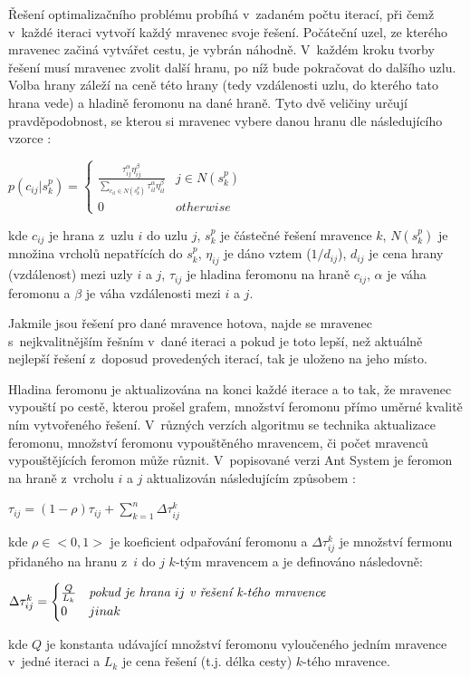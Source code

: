 \documentclass[a4paper, 12pt]{article}
\begin{document}
Řešení optimalizačního problému probíhá v~zadaném počtu iterací, při čemž v~každé iteraci vytvoří každý mravenec svoje řešení.
Počáteční uzel, ze kterého mravenec začiná vytvářet cestu, je vybrán náhodně.
V~každém kroku tvorby řešení musí mravenec zvolit další hranu, po níž bude pokračovat do dalšího uzlu. Volba hrany záleží na ceně této hrany (tedy vzdálenosti
uzlu, do kterého tato hrana vede) a hladině feromonu na dané hraně. Tyto dvě veličiny určují pravděpodobnost,
se kterou si mravenec vybere danou hranu dle následujícího vzorce \cite{aco:variations}:
\begin{center}
  $p(c_{ij}|s_k^p) =
   \begin{cases} 
      \frac{\tau^{\alpha}_{ij}\eta^{\beta}_{ij}}{\sum\limits_{c_{il}\in N(s_k^p)}{\tau^\alpha_{il}\eta^\beta_{il}}} & j \in N(s_k^p) \\
      0 & otherwise 
   \end{cases}
   $
\end{center}
kde $c_{ij}$ je hrana z~uzlu $i$ do uzlu $j$, $s_k^p$ je částečné řešení mravence $k$, $N(s_k^p)$ je množina vrcholů nepatřících do $s_k^p$, $\eta_{ij}$ je 
dáno vztem ($1/d_{ij}$), $d_{ij}$ je cena hrany (vzdálenost) mezi uzly $i$ a $j$, $\tau_{ij}$ je hladina feromonu na hraně $c_{ij}$, $\alpha$
je váha feromonu a $\beta$ je váha vzdálenosti mezi $i$ a $j$.

Jakmile jsou řešení pro dané mravence hotova, najde se mravenec s~nejkvalitnějším řešním v~dané iteraci a pokud je toto lepší, než aktuálně nejlepší řešení
z~doposud provedených iterací, tak je uloženo na jeho místo.

Hladina feromonu je aktualizována na konci každé iterace a to tak, že mravenec vypouští po cestě, kterou prošel grafem, množství feromonu přímo uměrné kvalitě
ním vytvořeného řešení. V~různých verzích algoritmu se technika aktualizace feromonu, množství feromonu vypouštěného mravencem, či počet mravenců vypouštějících 
feromon může různit. V~popisované verzi Ant System je feromon na hraně z~vrcholu $i$ a $j$ aktualizován následujícím způsobem \cite{aco:variations}:
\begin{center}
  $\tau_{ij}=(1-\rho)\tau_{ij}+\sum\limits_{k=1}^{n}\Delta\tau_{ij}^k$
\end{center}
kde $\rho \in <0,1>$ je koeficient odpařování feromonu
a $\Delta\tau_{ij}^k$ je množství fermonu přidaného na hranu z~$i$ do $j$ $k$-tým mravencem a je definováno následovně:
\begin{center}
  $\Delta\tau_{ij}^k = 
  \begin{cases}
    \frac{Q}{L_k} & \emph{pokud je hrana } ij \emph{ v~řešení k-tého mravence}\\
    0 & jinak
   \end{cases}
   $
\end{center}
kde $Q$ je konstanta udávající množství feromonu vyloučeného jedním mravence v~jedné iteraci a $L_k$ je cena řešení (t.j. délka cesty) $k$-tého mravence.
\end{document}
